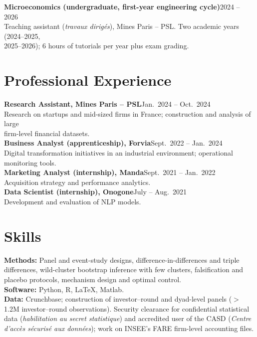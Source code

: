 \documentclass[11pt,a4paper]{article}
\newcommand{\entry}[2]{\textbf{#1}\hfill #2\\}
\begin{document}
\entry{Microeconomics (undergraduate, first-year engineering cycle)}{2024 -- 2026}
\hspace{1em} Teaching assistant (\emph{travaux dirigés}), Mines Paris -- PSL.
Two academic years (2024--2025, \\
\hspace{1em} 2025--2026); 6 hours of tutorials per year plus exam grading.

\section{Professional Experience}

\entry{Research Assistant, Mines Paris -- PSL}{Jan.\ 2024 -- Oct.\ 2024}
\hspace{1em} Research on startups and mid-sized firms in France; construction and
analysis of large \\
\hspace{1em} firm-level financial datasets.
\\[0.4em]

\entry{Business Analyst (apprenticeship), Forvia}{Sept.\ 2022 -- Jan.\ 2024}
\hspace{1em} Digital transformation initiatives in an industrial environment;
operational monitoring tools.
\\[0.4em]

\entry{Marketing Analyst (internship), Manda}{Sept.\ 2021 -- Jan.\ 2022}
\hspace{1em} Acquisition strategy and performance analytics.
\\[0.4em]

\entry{Data Scientist (internship), Onogone}{July -- Aug.\ 2021}
\hspace{1em} Development and evaluation of NLP models.

\section{Skills}

\textbf{Methods:} Panel and event-study designs, difference-in-differences and triple
differences, wild-cluster bootstrap inference with few clusters, falsification and
placebo protocols, mechanism design and optimal control. \\[0.3em]
\textbf{Software:} Python, R, \LaTeX{}, Matlab. \\[0.3em]
\textbf{Data:} Crunchbase; construction of investor--round and dyad-level panels
($>$1.2M investor--round observations). Security clearance for confidential
statistical data (\emph{habilitation au secret statistique}) and accredited user
of the CASD (\emph{Centre d'accès sécurisé aux données}); work on INSEE's FARE
firm-level accounting files.
\end{document}
